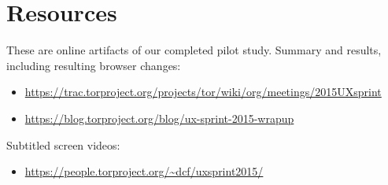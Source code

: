 \documentclass{sig-alternate-hotpets15}
\begin{document}
\section{Resources}

These are online artifacts of our completed pilot study.
Summary and results, including resulting browser changes:
\begin{itemize} \itemsep1pt \parskip0pt 
\item \url{https://trac.torproject.org/projects/tor/wiki/org/meetings/2015UXsprint}
\item \url{https://blog.torproject.org/blog/ux-sprint-2015-wrapup}
\end{itemize}

Subtitled screen videos:
\begin{itemize} \itemsep1pt \parskip0pt 
\item \url{https://people.torproject.org/~dcf/uxsprint2015/}
\end{itemize}


 
\end{document}
